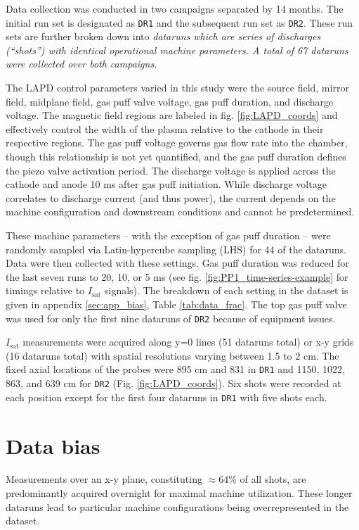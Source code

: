 Data collection was conducted in two campaigns separated by 14 months. The initial run set is designated as \texttt{DR1} and the subsequent run set as \texttt{DR2}. These run sets are further broken down into \em dataruns \em which are series of discharges (``shots'') with identical operational machine parameters. A total of 67 dataruns were collected over both campaigns. 

The LAPD control parameters varied in this study were the source field, mirror field, midplane field, gas puff valve voltage, gas puff duration, and discharge voltage. The magnetic field regions are labeled in fig. \ref{fig:LAPD_coords} and effectively control the width of the plasma relative to the cathode in their respective regions. The gas puff voltage governs gas flow rate into the chamber, though this relationship is not yet quantified, and the gas puff duration defines the piezo valve activation period. The discharge voltage is applied across the cathode and anode 10 ms after gas puff initiation. While discharge voltage correlates to discharge current (and thus power), the current depends on the machine configuration and downstream conditions and cannot be predetermined.

These machine parameters -- with the exception of gas puff duration -- were randomly sampled via Latin-hypercube sampling (LHS) for 44 of the dataruns. Data were then collected with these settings. Gas puff duration was reduced for the last seven runs to 20, 10, or 5 ms (see fig. \ref{fig:PP1_time-series-example} for timings relative to $I_\text{sat}$ signals). The breakdown of each setting in the dataset is given in appendix \ref{sec:app_bias}, Table \ref{tab:data_frac}. The top gas puff valve was used for only the first nine dataruns of \texttt{DR2} because of equipment issues. 

$I_\text{sat}$ measurements were acquired along y=0 lines (51 dataruns total) or x-y grids (16 dataruns total) with spatial resolutions varying between 1.5 to 2 cm. The fixed axial locations of the probes were 895 cm and 831 in \texttt{DR1} and 1150, 1022, 863, and 639 cm for \texttt{DR2} (Fig. \ref{fig:LAPD_coords}). Six shots were recorded at each position except for the first four dataruns in \texttt{DR1} with five shots each.


\section{Data bias \label{sec:app_bias}}

Measurements over an x-y plane, constituting $\approx 64\%$ of all shots, are predominantly acquired overnight for maximal machine utilization. These longer dataruns lead to particular machine configurations being overrepresented in the dataset. 

